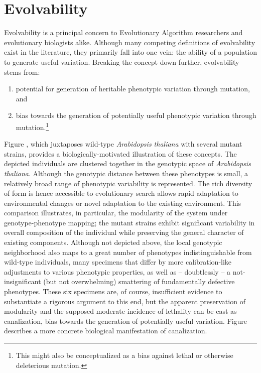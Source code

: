 \section{Evolvability}
Evolvability is a principal concern to Evolutionary Algorithm researchers and evolutionary biologists alike. Although many competing definitions of evolvability exist in the literature, they primarily fall into one vein: the ability of a population to generate useful variation. Breaking the concept down further, evolvability stems from:
\begin{enumerate}
\item potential for generation of heritable phenotypic variation through mutation, and \label{itm:heritable_variation}
\item bias towards the generation of potentially useful phenotypic variation through mutation.\footnote{This might also be conceptualized as a bias against lethal or otherwise deleterious mutation.} \label{itm:canalization}
\end{enumerate}

Figure , which juxtaposes wild-type \textit{Arabidopsis thaliana} with several mutant strains, provides a biologically-motivated illustration of these concepts. The depicted individuals are clustered together in the genotypic space of \textit{Arabidopsis thaliana}. Although the genotypic distance between these phenotypes is small, a relatively broad range of phenotypic variability is represented. The rich diversity of form is hence accessible to evolutionary search allows rapid adaptation to environmental changes or novel adaptation to the existing environment. This comparison illustrates, in particular, the modularity of the system under genotype-phenotype mapping; the mutant strains exhibit significant variability in overall composition of the individual while preserving the general character of existing components. Although not depicted above, the local genotypic neighborhood also maps to a great number of phenotypes indistinguishable from wild-type individuals, many specimens that differ by more calibration-like adjustments to various phenotypic properties, as well as -- doubtlessly -- a not-insignificant (but not overwhelming) smattering of fundamentally defective phenotypes. These six specimens are, of course, insufficient evidence to substantiate a rigorous argument to this end, but the apparent preservation of modularity and the supposed moderate incidence of lethality can be cast as canalization, bias towards the generation of potentially useful variation. Figure  describes a more concrete biological manifestation of canalization.

